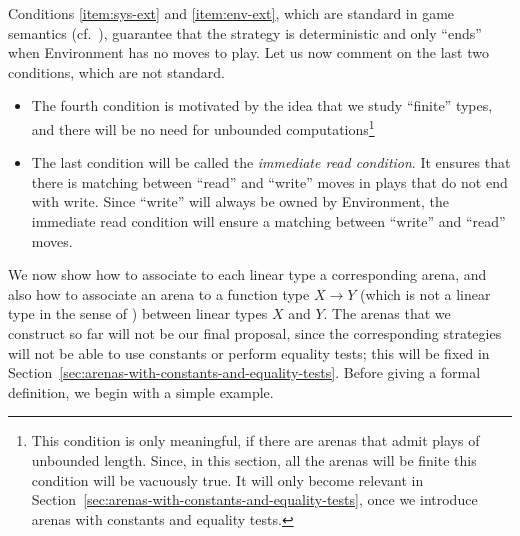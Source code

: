 \documentclass[a4paper,UKenglish,cleveref, autoref, numberwithinsect, thm-restate]{lipics-v2021}
\begin{document}
Conditions \ref{item:sys-ext} and \ref{item:env-ext}, which are standard in game semantics (cf.~\cite[p.~5]{abramsky2013semantics}),  guarantee that the strategy is deterministic and only ``ends'' when 
Environment has no moves to play.  Let us now comment on the last two conditions, which are not standard.
\begin{itemize}
    \item The fourth condition is motivated by the idea that we study ``finite'' types,  and there will be no need for unbounded computations\footnote{This condition is only meaningful, if there 
          are arenas that admit plays of unbounded length. Since, in this section, all the arenas will be finite this condition will be vacuously true. It will only become relevant in 
            Section~\ref{sec:arenas-with-constants-and-equality-tests}, once we introduce arenas with constants and equality tests.}
    \item The last condition will be called the  \emph{immediate read condition}. It ensures that there is matching between ``read'' and ``write'' moves in plays that do not end with write. Since ``write'' will always be owned by Environment, the immediate read condition will ensure a matching between ``write'' and ``read'' moves.
\end{itemize}
We now show how to associate to each linear type a corresponding arena, and also how to associate an arena to a function type $X \to Y$ (which is not a linear type in the sense of ) between linear types $X$ and $Y$. The arenas that we construct so far will not be our final proposal, since the corresponding strategies will not be able to use constants or perform equality tests; this will be fixed in Section~\ref{sec:arenas-with-constants-and-equality-tests}. Before giving a formal definition, we begin with a simple example.
\end{document}
